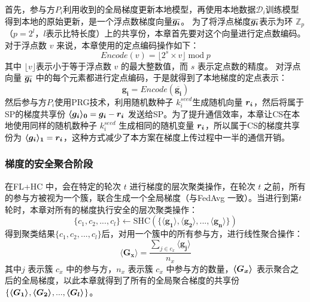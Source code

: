 首先，参与方$P_i$利用收到的全局梯度更新本地模型，再使用本地数据$\mathcal{D}_i$训练模型得到本地的原始更新，是一个浮点数梯度向量$\overline{\bs{g_i}}$。
为了将浮点梯度$\overline{\bs{g_i}}$表示为环 $\mathbb{Z}_p$（$p=2^l$，$l$表示比特长度）上的共享份，本章首先要对这个向量进行定点数编码。
对于浮点数 $v$ 来说，本章使用的定点编码操作如下：
\begin{equation}
	Encode(v) = \lfloor 2^s \times v\rfloor \;\text{mod}\;p
\end{equation}
其中 $\lfloor v\rfloor$表示小于等于浮点数 $v$ 的最大整数值，而 $s$ 表示定点数的精度。
对浮点向量 $\overline{\bs{g_i}}$ 中的每个元素都进行定点编码，于是就得到了本地梯度的定点表示：
\begin{equation}
	\boldsymbol{g_i} = Encode(\overline{\boldsymbol{g_i}})
\end{equation}
然后参与方$P_i$使用PRG技术，利用随机数种子 $k_i^{seed}$生成随机向量 $\bs{r_i}$，然后将属于SP的梯度共享份 $\svec[0]{g_i} = \bs{g_i} - \bs{r_i}$ 发送给SP。为了提升通信效率，本章让CS在本地使用同样的随机数种子 $k_i^{seed}$ 生成相同的随机变量 $\bs{r_i}$，所以属于CS的梯度共享份为 $\svec[1]{g_i} = \bs{r_i}$，这种方式减少了本方案在梯度上传过程中一半的通信开销。

\subsubsection{梯度的安全聚合阶段}
在FL+HC \cite{briggs2020federated}中，会在特定的轮次 $t$ 进行梯度的层次聚类操作，在轮次 $t$ 之前，所有的参与方被视为一个簇，联合生成一个全局梯度（与FedAvg \cite{mcmahan2017communication} 一致）。当进行到第$t$轮时，本章对所有的梯度执行安全的层次聚类操作：
\begin{equation}
	\{c_1,c_2,...,c_l \} \leftarrow \text{SHC}(\{\boldsymbol{\langle g_1\rangle}, \boldsymbol{\langle g_2\rangle},...,\boldsymbol{\langle g_n\rangle} \})
\end{equation}
得到聚类结果$\{c_1,c_2,...,c_l \}$后，对用一个簇中的所有参与方，进行线性聚合操作：
\begin{equation}
	\boldsymbol{\langle G_x\rangle} = \frac{\sum_{j \in c_x}\boldsymbol{\langle g_j\rangle}}{n_x}
\end{equation}
其中$j$ 表示簇 $c_x$ 中的参与方，$n_x$ 表示簇 $c_x$ 中参与方的数量，$\svec{G_x}$ 表示聚合之后的全局梯度，以此本章就得到了所有的全局聚合梯度的共享份 $\{\svec{G_1},\svec{G_2},...,\svec{G_l}\}$。


